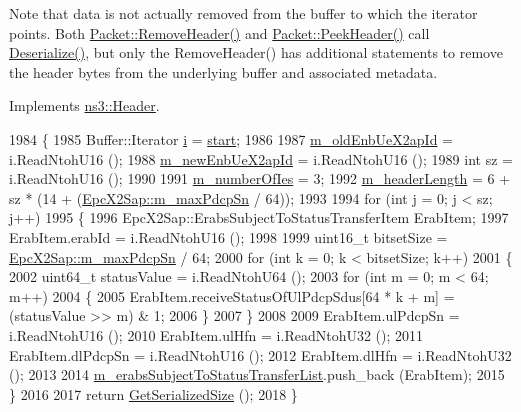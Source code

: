 Note that data is not actually removed from the buffer to which the iterator points. Both \hyperlink{classns3_1_1Packet_a0961eccf975d75f902d40956c93ba63e}{Packet\+::\+Remove\+Header()} and \hyperlink{classns3_1_1Packet_aadc63487bea70945c418f4c3e9b81964}{Packet\+::\+Peek\+Header()} call \hyperlink{classns3_1_1EpcX2SnStatusTransferHeader_a87cc0d726797ffc1264b65a5903ab668}{Deserialize()}, but only the Remove\+Header() has additional statements to remove the header bytes from the underlying buffer and associated metadata. 

Implements \hyperlink{classns3_1_1Header_a78be9400bb66b2a8543606f395ef5396}{ns3\+::\+Header}.


\begin{DoxyCode}
1984 \{
1985   Buffer::Iterator \hyperlink{bernuolliDistribution_8m_a6f6ccfcf58b31cb6412107d9d5281426}{i} = \hyperlink{namespacevisualizer_1_1core_a2a35e5d8a34af358b508dac8635754e0}{start};
1986 
1987   \hyperlink{classns3_1_1EpcX2SnStatusTransferHeader_a90611f272b846cf8617cb050bf2d88db}{m\_oldEnbUeX2apId} = i.ReadNtohU16 ();
1988   \hyperlink{classns3_1_1EpcX2SnStatusTransferHeader_ad9a1eee78ad41a6f2659d158e75f0d53}{m\_newEnbUeX2apId} = i.ReadNtohU16 ();
1989   \textcolor{keywordtype}{int} sz = i.ReadNtohU16 ();
1990 
1991   \hyperlink{classns3_1_1EpcX2SnStatusTransferHeader_ae3327053016fdbdcefb2848d64a9f672}{m\_numberOfIes} = 3;
1992   \hyperlink{classns3_1_1EpcX2SnStatusTransferHeader_ab68c11c68522b37d98cbd294d5b0dfd9}{m\_headerLength} = 6 + sz * (14 + (\hyperlink{classns3_1_1EpcX2Sap_a41ff74ac24a6c9005d586f75cf366f95}{EpcX2Sap::m\_maxPdcpSn} / 64));
1993 
1994   \textcolor{keywordflow}{for} (\textcolor{keywordtype}{int} j = 0; j < sz; j++)
1995     \{
1996       EpcX2Sap::ErabsSubjectToStatusTransferItem ErabItem;
1997       ErabItem.erabId = i.ReadNtohU16 ();
1998 
1999       uint16\_t bitsetSize = \hyperlink{classns3_1_1EpcX2Sap_a41ff74ac24a6c9005d586f75cf366f95}{EpcX2Sap::m\_maxPdcpSn} / 64;
2000       \textcolor{keywordflow}{for} (\textcolor{keywordtype}{int} k = 0; k < bitsetSize; k++)
2001         \{
2002           uint64\_t statusValue = i.ReadNtohU64 ();
2003           \textcolor{keywordflow}{for} (\textcolor{keywordtype}{int} m = 0; m < 64; m++)
2004             \{
2005               ErabItem.receiveStatusOfUlPdcpSdus[64 * k + m] = (statusValue >> m) & 1;
2006             \}
2007         \}
2008 
2009       ErabItem.ulPdcpSn = i.ReadNtohU16 ();
2010       ErabItem.ulHfn    = i.ReadNtohU32 ();
2011       ErabItem.dlPdcpSn = i.ReadNtohU16 ();
2012       ErabItem.dlHfn    = i.ReadNtohU32 ();
2013 
2014       \hyperlink{classns3_1_1EpcX2SnStatusTransferHeader_aacd21028528eae5bdea4d2c3fa3974d4}{m\_erabsSubjectToStatusTransferList}.push\_back (ErabItem);
2015     \}
2016 
2017   \textcolor{keywordflow}{return} \hyperlink{classns3_1_1EpcX2SnStatusTransferHeader_a5158d7c994f5e5e5adf5a8f4a28296f1}{GetSerializedSize} ();
2018 \}
\end{DoxyCode}


